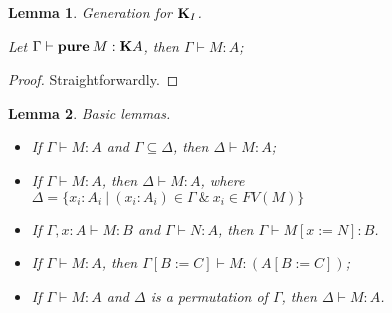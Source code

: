 \documentclass[a4paper]{article}
\newtheorem{lemma}{Lemma}
\begin{document}
\begin{lemma} Generation for ${\bf K}_I$.

  Let $\Gamma \vdash {\bf pure \:} M : {\bf K}A$, then $\Gamma \vdash M : A$;
\end{lemma}

\begin{proof}
  Straightforwardly.
\end{proof}

\begin{lemma} Basic lemmas.

\begin{itemize}
  \item If $\Gamma \vdash M : A$ and $\Gamma \subseteq \Delta$, then $\Delta \vdash M : A$;
  \item If $\Gamma \vdash M : A$, then $\Delta \vdash M : A$, where $\Delta = \{ x_i : A_i \: | \: (x_i : A_i) \in \Gamma \: \& \: x_i \in FV(M) \}$
  \item If $\Gamma, x : A \vdash M : B$ and $\Gamma \vdash N : A$, then $\Gamma \vdash M [x := N] : B$.
  \item If $\Gamma \vdash M : A$, then $\Gamma [B := C] \vdash M : (A [B := C])$;
  \item If $\Gamma \vdash M : A$ and $\Delta$ is a permutation of $\Gamma$, then $\Delta \vdash M : A$.
\end{itemize}
\end{lemma}
\end{document}
